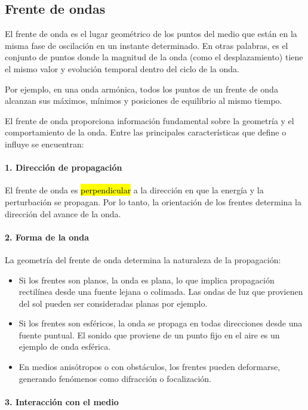 \subsection{Frente de ondas}

El frente de onda es el lugar geométrico de los puntos del medio que están en la misma fase de oscilación en un instante determinado. En otras palabras, es el conjunto de puntos donde la magnitud de la onda (como el desplazamiento) tiene el mismo valor y evolución temporal dentro del ciclo de la onda.

Por ejemplo, en una onda armónica, todos los puntos de un frente de onda alcanzan sus máximos, mínimos y posiciones de equilibrio al mismo tiempo.

El frente de onda proporciona información fundamental sobre la geometría y el comportamiento de la onda. Entre las principales características que define o influye se encuentran:

\paragraph{1. Dirección de propagación}

El frente de onda es \hl{perpendicular} a la dirección en que la energía y la perturbación se propagan. Por lo tanto, la orientación de los frentes determina la dirección del avance de la onda.

\paragraph{2. Forma de la onda}

La geometría del frente de onda determina la naturaleza de la propagación:
\begin{itemize}
  \item Si los frentes son planos, la onda es plana, lo que implica propagación rectilínea desde una fuente lejana o colimada. Las ondas de luz que provienen del sol pueden ser consideradas planas por ejemplo.
  \item Si los frentes son esféricos, la onda se propaga en todas direcciones desde una fuente puntual. El sonido que proviene de un punto fijo en el aire es un ejemplo de onda esférica.
  \item En medios anisótropos o con obstáculos, los frentes pueden deformarse, generando fenómenos como difracción o focalización.
\end{itemize}

\paragraph{3. Interacción con el medio}

